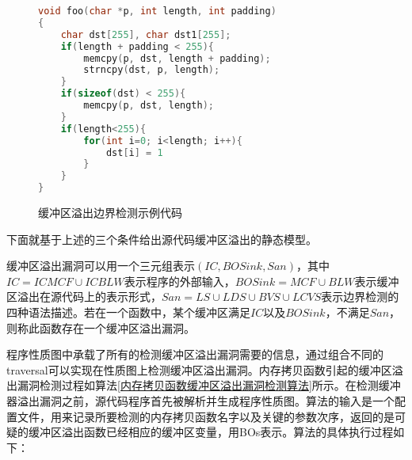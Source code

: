 {\begin{figure}[h]
\begin{lstlisting}[language=C]
void foo(char *p, int length, int padding)
{
	char dst[255], char dst1[255];
	if(length + padding < 255){
		memcpy(p, dst, length + padding);
		strncpy(dst, p, length);
	}
	if(sizeof(dst) < 255){
		memcpy(p, dst, length);
	}
	if(length<255){
		for(int i=0; i<length; i++){
			dst[i] = 1
		}
	}
}
\end{lstlisting}
\caption{缓冲区溢出边界检测示例代码}
\label{缓冲区溢出边界检测示例代码}
\end{figure}


下面就基于上述的三个条件给出源代码缓冲区溢出的静态模型。
\begin{definition}
\label{缓冲区溢出定义}
缓冲区溢出漏洞可以用一个三元组表示$(IC, BOSink, San)$，其中$IC = ICMCF \cup ICBLW$表示程序的外部输入，$BOSink = MCF \cup BLW$表示缓冲区溢出在源代码上的表示形式，$San = LS \cup LDS \cup BVS \cup LCVS$表示边界检测的四种语法描述。若在一个函数中，某个缓冲区满足$IC$以及$BOSink$，不满足$San$，则称此函数存在一个缓冲区溢出漏洞。
\end{definition}


程序性质图中承载了所有的检测缓冲区溢出漏洞需要的信息，通过组合不同的traversal可以实现在性质图上检测缓冲区溢出漏洞。内存拷贝函数引起的缓冲区溢出漏洞检测过程如算法\ref{内存拷贝函数缓冲区溢出漏洞检测算法}所示。在检测缓冲器溢出漏洞之前，源代码程序首先被解析并生成程序性质图。算法的输入是一个配置文件，用来记录所要检测的内存拷贝函数名字以及关键的参数次序，返回的是可疑的缓冲区溢出函数已经相应的缓冲区变量，用BOs表示。算法的具体执行过程如下：

}
